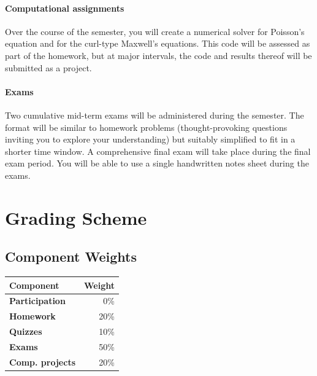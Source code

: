 \documentclass{syllabus}
\begin{document}
\paragraph{Computational assignments} 
Over the course of the semester, you will create a numerical solver for Poisson's equation and for the curl-type Maxwell's equations. This code will be assessed as part of the homework, but at major intervals, the code and results thereof will be submitted as a project. 



\paragraph{Exams} 
Two cumulative mid-term exams will be administered during the semester. The format will be similar to homework problems (thought-provoking questions inviting you to explore your understanding) but suitably simplified to fit in a shorter time window. A comprehensive final exam will take place during the final exam period. You will be able to use a single handwritten notes sheet during the exams.

\clearpage

\section*{Grading Scheme}
\subsection*{Component Weights}

\noindent\begin{tabular}{lr}
\textbf{Component} & \textbf{Weight}       \\ \hline
\textbf{Participation}      & 0\%  \\
\textbf{Homework}           & 20\%       \\
\textbf{Quizzes}            & 10\%       \\
\textbf{Exams}              & 50\% \\
\textbf{Comp. projects}       & 20\%\\
\end{tabular}%





\end{document}
